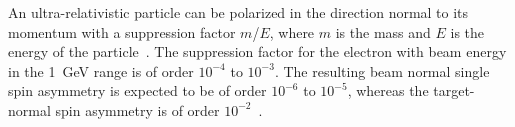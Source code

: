 \noindent
An ultra-relativistic particle can be polarized in the direction normal to its momentum with a suppression factor $m$/$E$, where $m$ is the mass and $E$ is the energy of the particle~\cite{doi:10.1146/annurev.nucl.57.090506.123116}. 
The suppression factor for the electron with beam energy in the 1~GeV range is of order $10^{-4}$ to $10^{-3}$. The resulting beam normal single spin asymmetry is expected to be of order $10^{-6}$ to $10^{-5}$, whereas the target-normal spin asymmetry is of order $10^{-2}$~\cite{doi:10.1146/annurev.nucl.57.090506.123116}.





